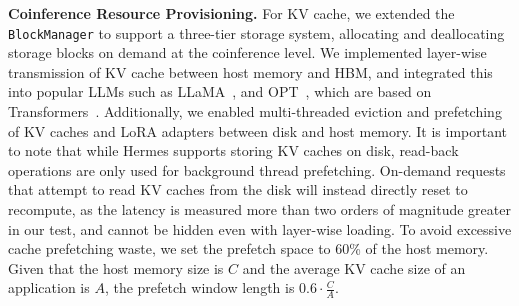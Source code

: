 \vspace{.3em}
\noindent\textbf{Coinference Resource Provisioning.} For KV cache, we extended the \texttt{BlockManager} to support a three-tier storage system, allocating and deallocating storage blocks on demand at the coinference level. We implemented layer-wise transmission of KV cache between host memory and HBM, and integrated this into popular LLMs such as LLaMA~\cite{touvron2023llama}, and OPT~\cite{zhang2022opt}, which are based on Transformers~\cite{wolf2019huggingface}. Additionally, we enabled multi-threaded eviction and prefetching of KV caches and LoRA adapters between disk and host memory. 
It is important to note that while Hermes supports storing KV caches on disk, read-back operations are only used for background thread prefetching. On-demand requests that attempt to read KV caches from the disk will instead directly reset to recompute, as the latency is measured more than two orders of magnitude greater in our test, and cannot be hidden even with layer-wise loading. To avoid excessive cache prefetching waste, we set the prefetch space to 60\% of the host memory. Given that the host memory size is $C$ and the average KV cache size of an application is $A$, the prefetch window length is $0.6 \cdot \frac{C}{A}$.
